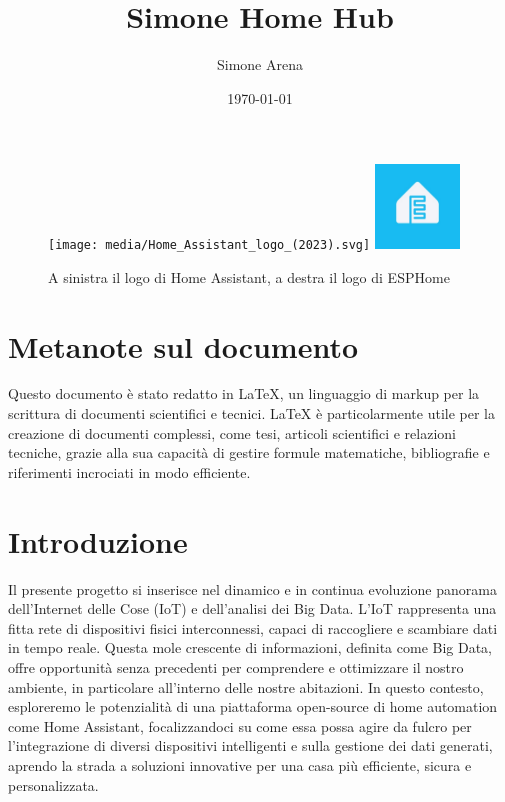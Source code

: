 \documentclass[11pt, a4paper]{article}
\title{Simone Home Hub}
\author{Simone Arena}
\date{\today}
\begin{document}
\maketitle

\begin{figure}[h!]
    \centering
    \texttt{[image: media/Home\_Assistant\_logo\_(2023).svg]}
    \hspace{1cm} %
    \includegraphics[width=0.2\textwidth]{media/esphome-logo.jpeg}
    \caption{A sinistra il logo di Home Assistant, a destra il logo di ESPHome}
    \label{fig:logos}
\end{figure}

\tableofcontents

\newpage

\section{Metanote sul documento}
Questo documento è stato redatto in LaTeX, un linguaggio di markup per la scrittura di documenti scientifici e tecnici.
LaTeX è particolarmente utile per la creazione di documenti complessi, come tesi, articoli scientifici e relazioni tecniche, 
grazie alla sua capacità di gestire formule matematiche, bibliografie e riferimenti incrociati in modo efficiente.

\newpage

\section{Introduzione}
Il presente progetto si inserisce nel dinamico 
e in continua evoluzione panorama dell'Internet 
delle Cose (IoT) e dell'analisi dei Big Data. 
L'IoT rappresenta una fitta rete di dispositivi 
fisici interconnessi, capaci di raccogliere e 
scambiare dati in tempo reale. Questa mole crescente 
di informazioni, definita come Big Data, offre opportunità 
senza precedenti per comprendere e ottimizzare il nostro ambiente, 
in particolare all'interno delle nostre abitazioni. 
In questo contesto, esploreremo le potenzialità di una 
piattaforma open-source di home automation come Home Assistant, 
focalizzandoci su come essa possa agire da fulcro per l'integrazione 
di diversi dispositivi intelligenti e sulla gestione dei dati generati, 
aprendo la strada a soluzioni innovative per una casa più efficiente, 
sicura e personalizzata.
\end{document}
